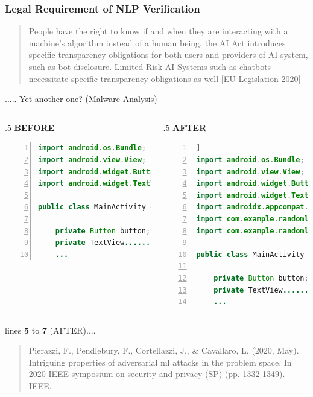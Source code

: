 \documentclass[t,compress,aspectratio=169]{beamer}
\begin{document}
\begin{frame}
\frametitle{Legal Requirement of NLP Verification}

    \begin{quote}
        \textcolor{aisecpurple}{People have the right to know if and when they are interacting with a machine’s algorithm instead of a human being, the AI Act introduces specific transparency obligations for both users and providers of AI system, such as bot disclosure. Limited Risk AI Systems such as chatbots necessitate specific transparency obligations as well [EU Legislation 2020]}

    \end{quote}

\end{frame}


\begin{frame}[fragile]{..... Yet another one? (Malware Analysis)}
\begin{columns}

\begin{column}{.5\textwidth}
 \textcolor{aisecred}{\textbf{BEFORE}}
\
        \begin{lstlisting}[language=java,basicstyle=\tiny,numbers=left]
import android.os.Bundle;
import android.view.View;
import android.widget.Button;
import android.widget.TextView;

public class MainActivity extends AppCompatActivity {

    private Button button;
    private TextView........
    ...
        \end{lstlisting}
    \end{column}
    \begin{column}{.5\textwidth}
 \textcolor{aisecred}{\textbf{AFTER}}
                \begin{lstlisting}[language=java,basicstyle=\tiny,numbers=left]]
import android.os.Bundle;
import android.view.View;
import android.widget.Button;
import android.widget.TextView;
import androidx.appcompat.app.AppCompatActivity;
import com.example.randomlibrary1.RandomLibrary1;
import com.example.randomlibrary2.RandomLibrary2;

public class MainActivity extends AppCompatActivity {

    private Button button;
    private TextView........
    ...
        \end{lstlisting}
    \end{column}
\end{columns}
lines \textbf{5} to \textbf{7} (AFTER)....
\vfill
	\begin{quote}
		\tiny Pierazzi, F., Pendlebury, F., Cortellazzi, J., \& Cavallaro, L. (2020, May). Intriguing properties of adversarial ml attacks in the problem space. In 2020 IEEE symposium on security and privacy (SP) (pp. 1332-1349). IEEE.

	\end{quote}
\end{frame}
\end{document}
